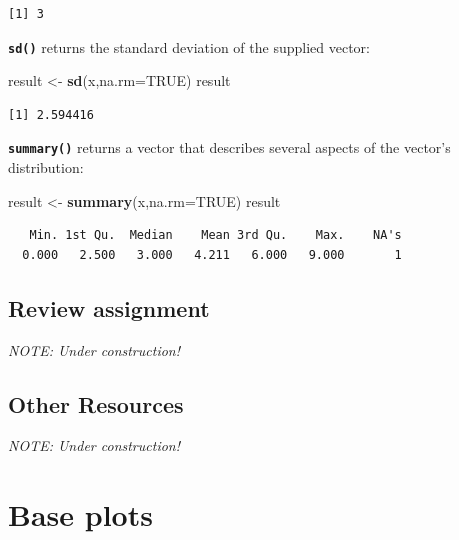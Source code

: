 \documentclass[
]{book}
\newenvironment{Shaded}{\begin{snugshade}}{\end{snugshade}}
\newcommand{\DataTypeTok}[1]{\textcolor[rgb]{0.13,0.29,0.53}{#1}}
\newcommand{\KeywordTok}[1]{\textcolor[rgb]{0.13,0.29,0.53}{\textbf{#1}}}
\newcommand{\NormalTok}[1]{#1}
\newcommand{\OtherTok}[1]{\textcolor[rgb]{0.56,0.35,0.01}{#1}}
\newcommand{\StringTok}[1]{\textcolor[rgb]{0.31,0.60,0.02}{#1}}
\begin{document}
\begin{verbatim}
[1] 3
\end{verbatim}

\textbf{\texttt{sd()}} returns the standard deviation of the supplied vector:

\begin{Shaded}
\begin{Highlighting}[]
\NormalTok{result <-}\StringTok{ }\KeywordTok{sd}\NormalTok{(x,}\DataTypeTok{na.rm=}\OtherTok{TRUE}\NormalTok{)}
\NormalTok{result}
\end{Highlighting}
\end{Shaded}

\begin{verbatim}
[1] 2.594416
\end{verbatim}

\textbf{\texttt{summary()}} returns a vector that describes several aspects of the vector's distribution:

\begin{Shaded}
\begin{Highlighting}[]
\NormalTok{result <-}\StringTok{ }\KeywordTok{summary}\NormalTok{(x,}\DataTypeTok{na.rm=}\OtherTok{TRUE}\NormalTok{)}
\NormalTok{result}
\end{Highlighting}
\end{Shaded}

\begin{verbatim}
   Min. 1st Qu.  Median    Mean 3rd Qu.    Max.    NA's 
  0.000   2.500   3.000   4.211   6.000   9.000       1 
\end{verbatim}

\hypertarget{review-assignment-4}{%
\section*{Review assignment}\label{review-assignment-4}}

\emph{NOTE: Under construction!}

\hypertarget{other-resources-2}{%
\section*{Other Resources}\label{other-resources-2}}

\emph{NOTE: Under construction!}

\hypertarget{base-plots}{%
\chapter{Base plots}\label{base-plots}}
\end{document}
